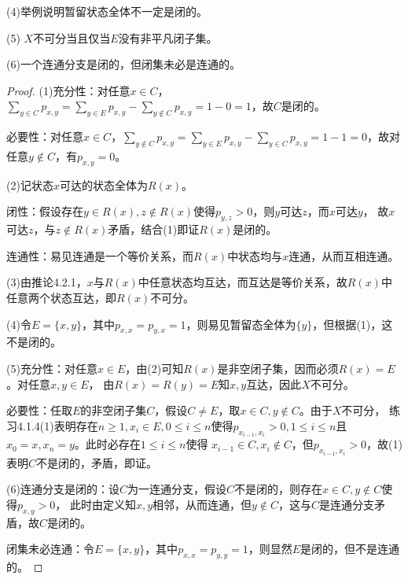 \begin{enumerate}
    (4)举例说明暂留状态全体不一定是闭的。

    (5) $X$不可分当且仅当$E$没有非平凡闭子集。

    (6)一个连通分支是闭的，但闭集未必是连通的。
    \begin{proof}
        (1)充分性：对任意$x\in C$，$\sum\limits_{y\in C}p_{x,y}=\sum\limits_{y\in E}p_{x,y}-
        \sum\limits_{y\notin C}p_{x,y}=1-0=1$，故$C$是闭的。

        必要性：对任意$x\in C$，$\sum\limits_{y\notin C}p_{x,y}=\sum\limits_{y\in E}p_{x,y}-
        \sum\limits_{y\in C}p_{x,y}=1-1=0$，故对任意$y\notin C$，有$p_{x,y}=0$。

        (2)记状态$x$可达的状态全体为$R(x)$。

        闭性：假设存在$y\in R(x),z\notin R(x)$使得$p_{y,z}>0$，则$y$可达$z$，而$x$可达$y$，
        故$x$可达$z$，与$z\notin R(x)$矛盾，结合(1)即证$R(x)$是闭的。

        连通性：易见连通是一个等价关系，而$R(x)$中状态均与$x$连通，从而互相连通。

        (3)由推论4.2.1，$x$与$R(x)$中任意状态均互达，而互达是等价关系，故$R(x)$中任意两个状态互达，即$R(x)$不可分。

        (4)令$E=\{x,y\}$，其中$p_{x,x}=p_{y,x}=1$，则易见暂留态全体为$\{y\}$，但根据(1)，这不是闭的。

        (5)充分性：对任意$x\in E$，由(2)可知$R(x)$是非空闭子集，因而必须$R(x)=E$。对任意$x,y\in E$，
        由$R(x)=R(y)=E$知$x,y$互达，因此$X$不可分。

        必要性：任取$E$的非空闭子集$C$，假设$C\neq E$，取$x\in C,y\notin C$。由于$X$不可分，
        练习4.1.4(1)表明存在$n\geqslant1,x_i\in E,0\leqslant i\leqslant n$使得$p_{x_{i-1},x_i}>0,
        1\leqslant i\leqslant n$且$x_0=x,x_n=y$。此时必存在$1\leqslant i\leqslant n$使得
        $x_{i-1}\in C,x_i\notin C$，但$p_{x_{i-1},x_i}>0$，故(1)表明$C$不是闭的，矛盾，即证。

        (6)连通分支是闭的：设$C$为一连通分支，假设$C$不是闭的，则存在$x\in C,y\notin C$使得$p_{x,y}>0$，
        此时由定义知$x,y$相邻，从而连通，但$y\notin C$，这与$C$是连通分支矛盾，故$C$是闭的。

        闭集未必连通：令$E=\{x,y\}$，其中$p_{x,x}=p_{y,y}=1$，则显然$E$是闭的，但不是连通的。
    \end{proof}
\end{enumerate}


